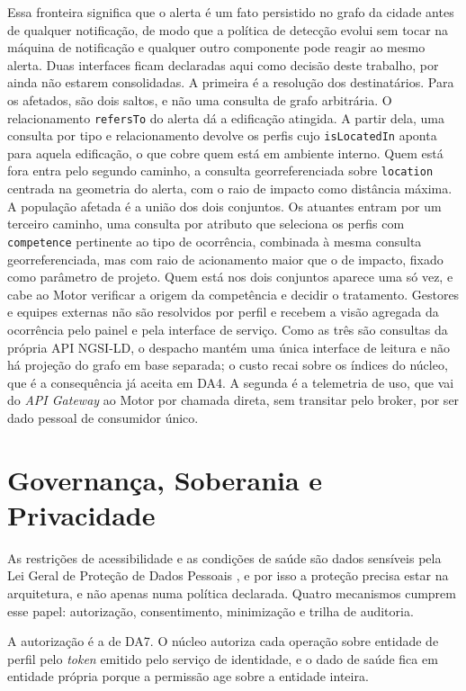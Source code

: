 Essa fronteira significa que o alerta é um fato persistido no grafo da cidade antes de qualquer notificação, de modo que a política de detecção evolui sem tocar na máquina de notificação e qualquer outro componente pode reagir ao mesmo alerta. Duas interfaces ficam declaradas aqui como decisão deste trabalho, por ainda não estarem consolidadas. A primeira é a resolução dos destinatários. Para os afetados, são dois saltos, e não uma consulta de grafo arbitrária. O relacionamento \texttt{refersTo} do alerta dá a edificação atingida. A partir dela, uma consulta por tipo e relacionamento devolve os perfis cujo \texttt{isLocatedIn} aponta para aquela edificação, o que cobre quem está em ambiente interno. Quem está fora entra pelo segundo caminho, a consulta georreferenciada sobre \texttt{location} centrada na geometria do alerta, com o raio de impacto como distância máxima. A população afetada é a união dos dois conjuntos. Os atuantes entram por um terceiro caminho, uma consulta por atributo que seleciona os perfis com \texttt{competence} pertinente ao tipo de ocorrência, combinada à mesma consulta georreferenciada, mas com raio de acionamento maior que o de impacto, fixado como parâmetro de projeto. Quem está nos dois conjuntos aparece uma só vez, e cabe ao Motor verificar a origem da competência e decidir o tratamento. Gestores e equipes externas não são resolvidos por perfil e recebem a visão agregada da ocorrência pelo painel e pela interface de serviço. Como as três são consultas da própria API NGSI-LD, o despacho mantém uma única interface de leitura e não há projeção do grafo em base separada; o custo recai sobre os índices do núcleo, que é a consequência já aceita em DA4. A segunda é a telemetria de uso, que vai do \textit{API Gateway} ao Motor por chamada direta, sem transitar pelo broker, por ser dado pessoal de consumidor único.

\section{Governança, Soberania e Privacidade}
\label{sec:governanca}

As restrições de acessibilidade e as condições de saúde são dados sensíveis pela Lei Geral de Proteção de Dados Pessoais \cite{brasil2018lgpd}, e por isso a proteção precisa estar na arquitetura, e não apenas numa política declarada. Quatro mecanismos cumprem esse papel: autorização, consentimento, minimização e trilha de auditoria.

A autorização é a de DA7. O núcleo autoriza cada operação sobre entidade de perfil pelo \textit{token} emitido pelo serviço de identidade, e o dado de saúde fica em entidade própria porque a permissão age sobre a entidade inteira.

